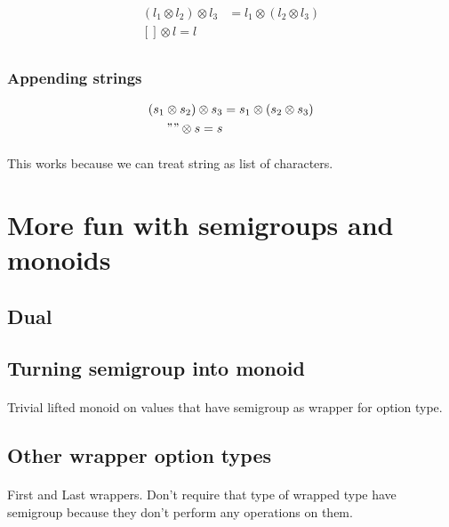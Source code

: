 \documentclass{article}
\begin{document}
    \begin{align*}
        (l_1 \otimes l_2) \otimes l_3 &= l_1 \otimes (l_2 \otimes l_3) \\
        [] \otimes l = l \\
    \end{align*}

    \subsubsection{Appending strings}

    \begin{align*}
        (s_1 \otimes s_2) \otimes s_3 &= s_1 \otimes (s_2 \otimes s_3) \\
        "" \otimes s = s \\
    \end{align*}

    \paragraph{}
    This works because we can treat string as list of characters.

    \section{More fun with semigroups and monoids}
    \subsection{Dual}
    \subsection{Turning semigroup into monoid}

    \paragraph{} 
    Trivial lifted monoid on values that have semigroup as wrapper for option type.

    \subsection{Other wrapper option types}

    \paragraph{}
    First and Last wrappers. Don't require that type of wrapped type have semigroup because they don't perform any operations on them.
\end{document}
